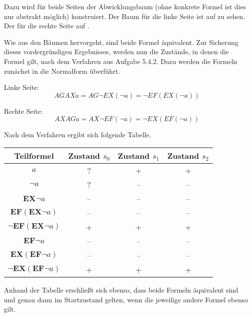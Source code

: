 \documentclass[10pt,a4paper,oneside,ngerman,numbers=noenddot]{scrartcl}
\begin{document}
	Dazu wird für beide Seiten der Abwicklungsbaum (ohne konkrete Formel ist dies nur abstrakt möglich) konstruiert. Der Baum für die linke Seite ist auf  zu sehen. Der für die rechte Seite auf .
	
	Wie aus den Bäumen hervorgeht, sind beide Formel äquivalent. Zur Sicherung dieses vordergründigen Ergebnisses, werden nun die Zustände, in denen die Formel gilt, nach dem Verfahren aus Aufgabe 5.4.2. Dazu werden die Formeln zunächst in die Normalform überführt.

Linke Seite:	
	\[AGAX a = AG\lnot EX(\lnot a) = \lnot EF(EX(\lnot a))\]
	
Rechte Seite:
	\[AXAG a = AX\lnot EF(\lnot a) = \lnot EX(EF(\lnot a))\]
	
	Nach dem Verfahren ergibt sich folgende Tabelle.
	
	\begin{tabular}{c|c|c|c}
		Teilformel & Zustand \(s_{0}\) & Zustand \(s_{1}\) & Zustand \(s_{2}\) \\
		\hline
		\hline
		\(a\) & ? & + & + \\
		\(\lnot a\) & ? & -- & -- \\
		\(\textbf{EX}\lnot a\) & -- & -- & -- \\
		\(\textbf{EF}(\textbf{EX}\lnot a) \) & -- & -- & -- \\
		\(\lnot \textbf{EF}(\textbf{EX}\lnot a) \) & + & + & + \\
		\(\textbf{EF} \lnot a\) & -- & -- & -- \\
		\(\textbf{EX}(\textbf{EF} \lnot a) \) & -- & -- & -- \\		
		\(\lnot \textbf{EX}(\textbf{EF} \lnot a) \) & + & + & + \\
	\end{tabular}
	
	Anhand der Tabelle erschließt sich ebenso, dass beide Formeln äquivalent sind und genau dann im Startzustand gelten, wenn die jeweilige andere Formel ebenso gilt.
	
\end{document}
